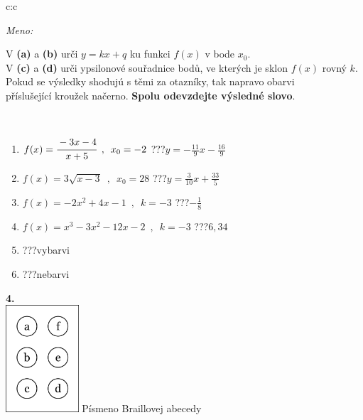 \documentclass[10pt]{report}
\begin{document}
\begin{tabular}{c:c}
\begin{minipage}[c][104.5mm][t]{0.5\linewidth}
\begin{center}
\textit{Meno:}\phantom{xxxxxxxxxxxxxxxxxxxxxxxxxxxxxxxxxxxxxxxxxxxxxxxxxxxxxxxxxxxxxxxxx}\\[5mm]
\begin{minipage}{0.95\linewidth}
\begin{center}
V \textbf{(a)} a \textbf{(b)} urči  $y = kx + q$ ku funkci $f(x)$ v bode $x_0$.\\V \textbf{(c)} a \textbf{(d)} urči ypsilonové souřadnice bodů, ve kterých je sklon $f(x)$ rovný $k$.\\Pokud se výsledky shodujú s těmi za otazníky, tak napravo obarvi\\příslušející kroužek načerno. \textbf{Spolu odevzdejte výsledné slovo}.
\end{center}
\end{minipage}
\\[1mm]
\begin{minipage}{0.79\linewidth}
\begin{center}
\begin{varwidth}{\linewidth}
\begin{enumerate}
\small
\item $f(x)=\cfrac{-3x-4}{x+5}\enspace , \enspace x_0=-2$\quad \dotfill\; ???\;\dotfill \quad $y = -\frac{11}{9}x-\frac{16}{9}$
\item $f(x)=3\sqrt{x-3}\enspace , \enspace x_0=28$\quad \dotfill\; ???\;\dotfill \quad $y = \frac{3}{10}x+\frac{33}{5}$
\item $f(x)=-2x^2+4x-1\enspace , \enspace k=-3$\quad \dotfill\; ???\;\dotfill \quad $-\frac{1}{8}$
\item $f(x)=x^3-3x^2-12x-2\enspace , \enspace k=-3$\quad \dotfill\; ???\;\dotfill \quad $6 , 34$
\item \quad \dotfill\; ???\;\dotfill \quad vybarvi
\item \quad \dotfill\; ???\;\dotfill \quad nebarvi
\end{enumerate}
\end{varwidth}
\end{center}
\end{minipage}
\begin{minipage}{0.20\linewidth}
\begin{center}
{\Huge\bfseries 4.} \\[2mm]
\includegraphics[height=40mm]{../images/braille.png}
{\small Písmeno Braillovej abecedy}
\end{center}
\end{minipage}
\end{center}
\end{minipage}
%
\end{tabular}
\end{document}
